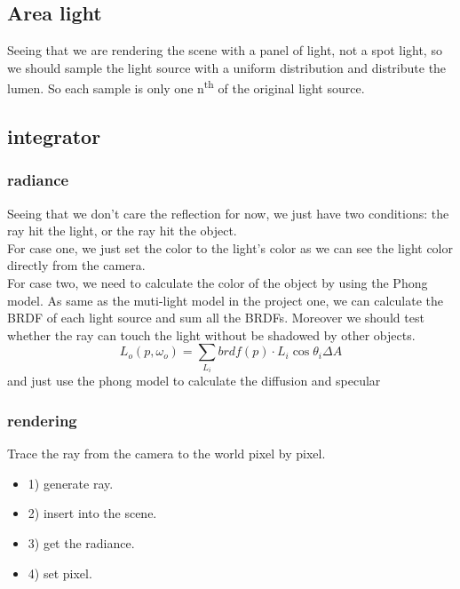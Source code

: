 \documentclass[acmtog]{acmart}
\begin{document}
\subsection{Area light}
 Seeing that we are rendering the scene with a panel of light, not a spot light, so we should sample the light source with a uniform distribution and distribute the lumen.
So each sample is only one n\textsuperscript{th} of the original light source.
\subsection{integrator}
\subsubsection{radiance}
Seeing that we don't care the reflection for now, we just have two conditions: the ray hit the light, or the ray hit the object.\\
For case one, we just set the color to the light's color as we can see the light color directly from the camera. \\
For case two, we need to calculate the color of the object by using the Phong model.
As same as the muti-light model in the project one, we can calculate the BRDF of each light source and sum all the BRDFs. Moreover we should test whether the ray can touch the light without be shadowed by other objects.
\begin{equation}
	L_o(p,\omega_o) = \sum_{L_i}brdf(p)\cdot L_i \cos{\theta_i} \Delta A
\end{equation}
and just use the phong model to calculate the diffusion and specular
\subsubsection{rendering}
Trace the ray from the camera to the world pixel by pixel.
\begin{itemize}
	\item 1) generate ray.
	\item 2) insert into the scene.
	\item 3) get the radiance.
	\item 4) set pixel.
\end{itemize}
\end{document}
